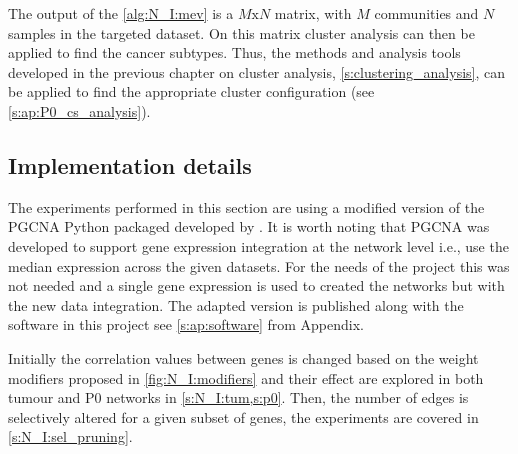 The output of the \cref{alg:N_I:mev} is a $M\text{x}N$ matrix, with $M$ communities and $N$ samples in the targeted dataset. On this matrix cluster analysis can then be applied to find the cancer subtypes. Thus, the methods and analysis tools developed in the previous chapter on cluster analysis, \cref{s:clustering_analysis}, can be applied to find the appropriate cluster configuration (see \cref{s:ap:P0_cs_analysis}).


\subsection{Implementation details} \label{s:N_I:implementation}

The experiments performed in this section are using a modified version of the PGCNA Python packaged developed by \citet{Care2019-ij}. It is worth noting that PGCNA was developed to support gene expression integration at the network level i.e., use the median expression across the given datasets. For the needs of the project this was not needed and a single gene expression is used to created the networks but with the new data integration. The adapted version is published along with the software in this project see \cref{s:ap:software} from Appendix.

Initially the correlation values between genes is changed based on the weight modifiers proposed in \cref{fig:N_I:modifiers} and their effect are explored in both tumour and P0 networks in \cref{s:N_I:tum,s:p0}. Then, the number of edges is selectively altered for a given subset of genes, the experiments are covered in \cref{s:N_I:sel_pruning}. 





